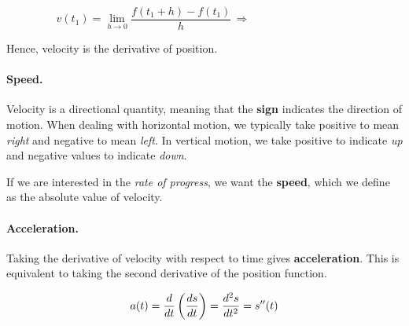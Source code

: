\documentclass[12pt]{article}
\begin{document}
$$v(t_1)=\lim_{h\to 0}\frac{f(t_1+h)-f(t_1)}{h} \, \Longrightarrow \phantom{v(t)=\frac{ds}{dt}=s'(t)}$$

\vspace{3mm}

Hence, velocity is the derivative of position.

\vspace{3mm}

\paragraph{Speed.} Velocity is a directional quantity, meaning that the \textbf{sign} indicates the direction of motion. When dealing with horizontal motion, we typically take positive to mean \textit{right} and negative to mean \textit{left}. In vertical motion, we take positive to indicate \textit{up} and negative values to indicate \textit{down}.

\vspace{3mm}

If we are interested in the \textit{rate of progress}, we want the \textbf{speed}, which we define as the absolute value of velocity.

\vspace{3mm}

\newpage

\paragraph{Acceleration.} Taking the derivative of velocity with respect to time gives \textbf{acceleration}. This is equivalent to taking the second derivative of the position function.

$$a(t)=\frac{d}{dt}\left( \frac{ds}{dt}\right)=\frac{d^2s}{dt^2}=s''(t)$$

\vspace{3mm}


\vspace{5mm}
\end{document}
